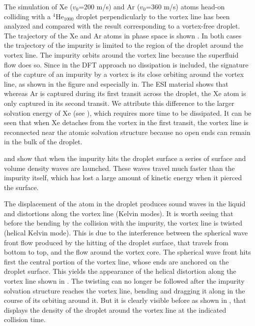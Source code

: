 The simulation of Xe ($v_0$=200 m/s) and Ar ($v_0$=360 m/s) atoms head-on colliding with a $^4$He$_{1000}$ droplet perpendicularly to the vortex line has been analyzed and
compared with the result corresponding to a vortex-free droplet. The trajectory of the Xe and Ar atoms in phase space is shown . In both cases the trajectory of the impurity
is limited to the region of the droplet around the vortex line. The impurity orbits around the vortex line because the superfluid flow does so. Since in the DFT approach
no dissipation is included, the signature of the capture of an impurity by a vortex is its close orbiting around the vortex line, as shown in the figure
and especially in. The ESI material shows that whereas Ar is captured during its first transit across the droplet, the Xe atom is only captured in its second transit. We attribute this difference 
to the larger solvation energy of Xe (see ), which requires more time to be dissipated. It can be seen\citep{Coppens2017-2} that when Xe detaches from the vortex  in the first
transit,   the  vortex line is reconnected near the atomic solvation structure because no open ends can remain in the bulk of the droplet.
  
 and  show that
 when the impurity hits the droplet surface a series of surface and volume density waves are launched.
These waves travel  much faster than the impurity itself, 
which has lost a large amount of kinetic energy when it pierced the surface.

The displacement of the  atom in the droplet
produces sound waves in the liquid and distortions along the vortex line (Kelvin modes). 
It is worth seeing that before the bending by the collision with the impurity, the vortex line is twisted (helical Kelvin mode). 
  This  is due to the interference between the  spherical wave front flow
 produced by the hitting of the droplet surface, that travels from bottom to top, 
 and the  flow around the vortex core.
 The spherical wave front  hits first the central portion of the vortex line, whose ends are anchored on the droplet surface. This yields the appearance of the helical distortion
 along the vortex line shown in .
 The twisting  can no longer  be followed after the
 impurity solvation structure reaches the vortex line, bending and dragging it along in the course of its orbiting around it. But it is clearly visible before as shown in , that displays the
 density of the droplet around the vortex line at the indicated collision time. 

